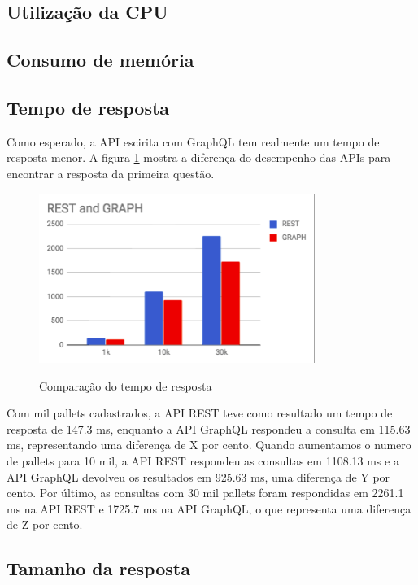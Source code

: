 \subsection{Utilização da CPU}
    
\subsection{Consumo de memória}

\subsection{Tempo de resposta}

Como esperado, a API escirita com GraphQL tem realmente um tempo de resposta menor. A figura \ref{fig:q1-time} mostra a diferença do desempenho das APIs para encontrar a resposta da primeira questão.

\begin{figure}[htbp]
    \centering
    \includegraphics[width=0.8\textwidth]{figuras/Q1-result-request-time.png}
    \label{fig:q1-time}
    \caption{Comparação do tempo de resposta}
    \author{fonte: Autor}
\end{figure}

Com mil pallets cadastrados, a API REST teve como resultado um tempo de resposta de 147.3 ms, enquanto a API GraphQL respondeu a consulta em 115.63 ms, representando uma diferença de X por cento. Quando aumentamos o numero de pallets para 10 mil, a API REST respondeu as consultas em 1108.13 ms e a API GraphQL devolveu os resultados em 925.63 ms, uma diferença de Y por cento. Por último, as consultas com 30 mil pallets foram respondidas em 2261.1 ms na API REST e 1725.7 ms na API GraphQL, o que representa uma diferença de Z por cento.

\subsection{Tamanho da resposta}

